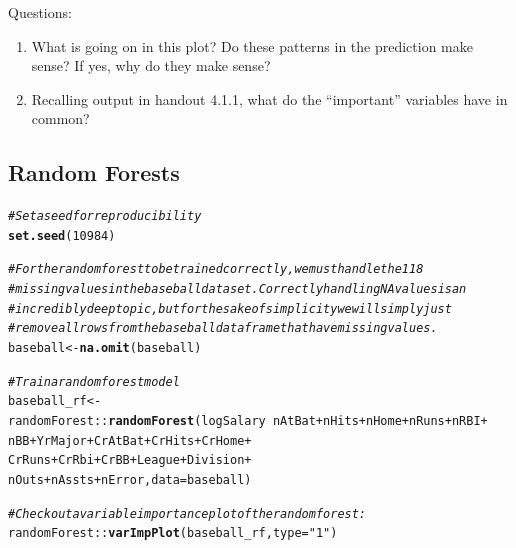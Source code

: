 \documentclass{article}\usepackage[]{graphicx}\usepackage[]{color}
\makeatletter
\newcommand{\hlnum}[1]{\textcolor[rgb]{0.686,0.059,0.569}{#1}}%
\newcommand{\hlstr}[1]{\textcolor[rgb]{0.192,0.494,0.8}{#1}}%
\newcommand{\hlcom}[1]{\textcolor[rgb]{0.678,0.584,0.686}{\textit{#1}}}%
\newcommand{\hlopt}[1]{\textcolor[rgb]{0,0,0}{#1}}%
\newcommand{\hlstd}[1]{\textcolor[rgb]{0.345,0.345,0.345}{#1}}%
\newcommand{\hlkwb}[1]{\textcolor[rgb]{0.69,0.353,0.396}{#1}}%
\newcommand{\hlkwc}[1]{\textcolor[rgb]{0.333,0.667,0.333}{#1}}%
\newcommand{\hlkwd}[1]{\textcolor[rgb]{0.737,0.353,0.396}{\textbf{#1}}}%
\newenvironment{kframe}{%
 \def\at@end@of@kframe{}%
 \ifinner\ifhmode%
  \def\at@end@of@kframe{\end{minipage}}%
  \begin{minipage}{\columnwidth}%
 \fi\fi%
 \def\FrameCommand##1{\hskip\@totalleftmargin \hskip-\fboxsep
 \colorbox{shadecolor}{##1}\hskip-\fboxsep
     \hskip-\linewidth \hskip-\@totalleftmargin \hskip\columnwidth}%
 \MakeFramed {\advance\hsize-\width
   \@totalleftmargin\z@ \linewidth\hsize
   \@setminipage}}%
 {\par\unskip\endMakeFramed%
 \at@end@of@kframe}
\newenvironment{knitrout}{}{} %
\makeatother
\begin{document}
Questions:
\begin{enumerate}
  \item What is going on in this plot? Do these patterns in the prediction make sense? If yes, why do they make sense?
  \item Recalling output in handout 4.1.1, what do the ``important'' variables have in common?
\end{enumerate}

\newpage

\subsection*{Random Forests}

\begin{knitrout}
\color{fgcolor}\begin{kframe}
\begin{alltt}
\hlcom{# Set a seed for reproducibility}
\hlkwd{set.seed}\hlstd{(}\hlnum{10984}\hlstd{)}

\hlcom{# For the random forest to be trained correctly, we must handle the 118}
\hlcom{# missing values in the baseball dataset. Correctly handling NA values is an}
\hlcom{# incredibly deep topic, but for the sake of simplicity we will simply just}
\hlcom{# remove all rows from the baseball dataframe that have missing values.}
\hlstd{baseball} \hlkwb{<-} \hlkwd{na.omit}\hlstd{(baseball)}

\hlcom{# Train a random forest model}
\hlstd{baseball_rf} \hlkwb{<-}
  \hlstd{randomForest}\hlopt{::}\hlkwd{randomForest}\hlstd{(logSalary} \hlopt{~} \hlstd{nAtBat} \hlopt{+} \hlstd{nHits} \hlopt{+} \hlstd{nHome} \hlopt{+} \hlstd{nRuns} \hlopt{+} \hlstd{nRBI} \hlopt{+}
                               \hlstd{nBB} \hlopt{+} \hlstd{YrMajor} \hlopt{+} \hlstd{CrAtBat} \hlopt{+} \hlstd{CrHits} \hlopt{+} \hlstd{CrHome} \hlopt{+}
                               \hlstd{CrRuns} \hlopt{+} \hlstd{CrRbi} \hlopt{+} \hlstd{CrBB} \hlopt{+} \hlstd{League} \hlopt{+} \hlstd{Division} \hlopt{+}
                               \hlstd{nOuts} \hlopt{+} \hlstd{nAssts} \hlopt{+} \hlstd{nError,} \hlkwc{data} \hlstd{= baseball)}

\hlcom{# Check out a variable importance plot of the random forest:}
\hlstd{randomForest}\hlopt{::}\hlkwd{varImpPlot}\hlstd{(baseball_rf,} \hlkwc{type} \hlstd{=} \hlstr{"1"}\hlstd{)}
\end{alltt}


{\ttfamily\noindent\bfseries\color{errorcolor}{\#\# Error in imp[, i]: subscript out of bounds}}\end{kframe}
\end{knitrout}
\end{document}
